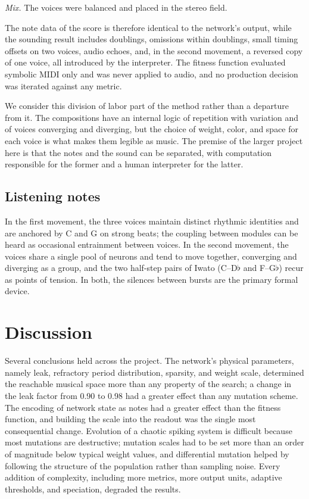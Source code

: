 \documentclass[conference]{IEEEtran}
\newcommand{\fl}{$\flat$}
\begin{document}
\emph{Mix.} The voices were balanced and placed in the stereo field.

The note data of the score is therefore identical to the network's output, while the sounding result includes doublings, omissions within doublings, small timing offsets on two voices, audio echoes, and, in the second movement, a reversed copy of one voice, all introduced by the interpreter. The fitness function evaluated symbolic MIDI only and was never applied to audio, and no production decision was iterated against any metric.

We consider this division of labor part of the method rather than a departure from it. The compositions have an internal logic of repetition with variation and of voices converging and diverging, but the choice of weight, color, and space for each voice is what makes them legible as music. The premise of the larger project here is that the notes and the sound can be separated, with computation responsible for the former and a human interpreter for the latter.

\subsection{Listening notes}

In the first movement, the three voices maintain distinct rhythmic identities and are anchored by C and G on strong beats; the coupling between modules can be heard as occasional entrainment between voices. In the second movement, the voices share a single pool of neurons and tend to move together, converging and diverging as a group, and the two half-step pairs of Iwato (C--D\fl{} and F--G\fl) recur as points of tension. In both, the silences between bursts are the primary formal device.

\section{Discussion}

Several conclusions held across the project. The network's physical parameters, namely leak, refractory period distribution, sparsity, and weight scale, determined the reachable musical space more than any property of the search; a change in the leak factor from 0.90 to 0.98 had a greater effect than any mutation scheme. The encoding of network state as notes had a greater effect than the fitness function, and building the scale into the readout was the single most consequential change. Evolution of a chaotic spiking system is difficult because most mutations are destructive; mutation scales had to be set more than an order of magnitude below typical weight values, and differential mutation helped by following the structure of the population rather than sampling noise. Every addition of complexity, including more metrics, more output units, adaptive thresholds, and speciation, degraded the results.
\end{document}
